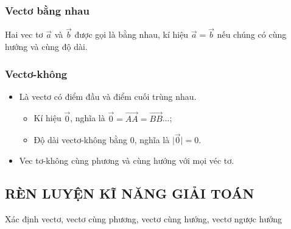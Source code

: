 \subsubsection{Vectơ bằng nhau}
Hai vec tơ $\vec{a}$ và $\vec{b}$ được gọi là bằng nhau, kí hiệu $\vec{a}=\vec{b}$ nếu chúng có cùng hướng và cùng độ dài.
\subsubsection{Vectơ-không}
	\begin{itemize}
		\item[\iconMT] Là vectơ có điểm đầu và điểm cuối trùng nhau. 
		\begin{itemize}
			\item Kí hiệu $\vec{0}$, nghĩa là $\vec{0}=\vec{AA}=\vec{BB}$...;
			\item Độ dài vectơ-không bằng $0$, nghĩa là $\bigg|\vec{0}\bigg|=0$.
		\end{itemize}

		\item[\iconMT]  Vec tơ-không cùng phương và cùng hướng với mọi véc tơ.
	\end{itemize}
\subsection{RÈN LUYỆN KĨ NĂNG GIẢI TOÁN}

\begin{dang}{Xác định vectơ, vectơ cùng phương, vectơ cùng hướng, vectơ ngược hướng}
\end{dang}

\begin{vd}
\end{vd} 


